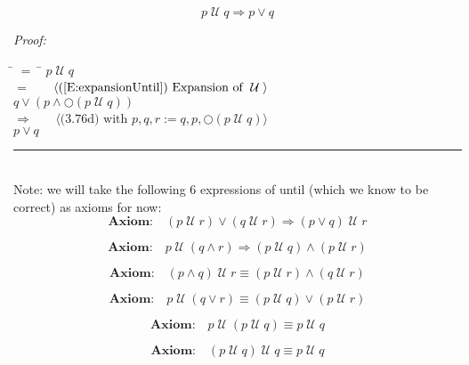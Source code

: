\documentclass[fleqn, leqno]{article}
\newcommand{\lgap}{2pt}                             %
\newcommand{\mymathindent}{24pt}                      %
\newcommand{\Until}{\;\mathcal{U}\;}
\newcommand{\Next}{\bigcirc}
\newcommand{\myqed}{\hfill\rule[-.23ex]{1.2ex}{2.0ex}}
\newcommand{\Gll} {\langle}                         %
\newcommand{\Ggg} {\rangle}                         %
\newcommand{\Hint}[1]     {\ \ \ $\Gll              \mbox{#1} \Ggg$ }   %
\begin{document}
\begin{equation}\label{E:untilImpOr}
p \Until q \Rightarrow p \lor q
\end{equation}

\emph{Proof:}
\begin{tabbing}
\hspace{\mymathindent} \= $= \;$ \= \kill
  \> \>   $p \Until q$\\[\lgap]
  \> $=$  \>  \Hint{(\ref{E:expansionUntil}) Expansion of $\Until$}\\[\lgap]
  \> \>   $q \lor (p \land \Next(p \Until q))$\\[\lgap]
  \> $\Rightarrow$  \>  \Hint{(3.76d) with $p,q,r := q,p,\Next(p \Until q)$}\\[\lgap]
  \> \>   $p \lor q$\\[\lgap]
\end{tabbing}
\myqed\\[\lgap]


Note: we will take the following 6 expressions of until (which we know to be correct) as axioms for now:\\

\begin{equation}\label{E:untilOrImp}
\textbf{Axiom:}\quad (p \Until r) \lor (q \Until r) \Rightarrow (p \lor q) \Until r
\end{equation}

\begin{equation}\label{E:untilAndImp}
\textbf{Axiom:}\quad p \Until (q \land r) \Rightarrow (p \Until q) \land (p \Until r)
\end{equation}

\begin{equation}\label{E:untilAndEquiv}
\textbf{Axiom:}\quad (p \land q) \Until r \equiv (p \Until r) \land (q \Until r)
\end{equation}

\begin{equation}\label{E:untilOrEquiv}
\textbf{Axiom:}\quad p \Until (q \lor r) \equiv (p \Until q) \lor (p \Until r)
\end{equation}

\begin{equation}\label{E:untilIdem}
\textbf{Axiom:}\quad p \Until (p \Until q) \equiv p \Until q
\end{equation}

\begin{equation}\label{E:untilIdemR}
\textbf{Axiom:}\quad (p \Until q) \Until q \equiv p \Until q
\end{equation}
\end{document}
